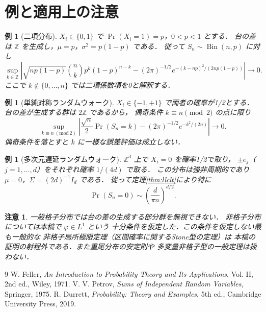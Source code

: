 \documentclass[a5paper,10pt,onecolumn]{jsarticle}
\theoremstyle{mathnotetheorem}
\newtheorem{example}[theorem]{例}
\newtheorem{remark}[theorem]{注意}
\begin{document}
\section{例と適用上の注意}
\begin{example}[二項分布]
$X_i\in\{0,1\}$ で $\Pr(X_i=1)=p$，$0<p<1$ とする．
台の差は $\mathbb Z$ を生成し，$\mu=p$，$\sigma^2=p(1-p)$ である．
従って $S_n\sim\operatorname{Bin}(n,p)$ に対し
\[
 \sup_{k\in\mathbb Z}\left|
 \sqrt{np(1-p)}\binom nk p^k(1-p)^{n-k}
 -(2\pi)^{-1/2}e^{-(k-np)^2/(2np(1-p))}
 \right|\to0.
\]
ここで $k\notin\{0,\ldots,n\}$ では二項係数項を0と解釈する．
\end{example}

\begin{example}[単純対称ランダムウォーク]
$X_i\in\{-1,+1\}$ で両者の確率が1/2とする．
台の差が生成する群は $2\mathbb Z$ であるから，
偶奇条件 $k\equiv n\pmod2$ の点に限り
\[
 \sup_{k\equiv n\ (\mathrm{mod}\,2)}
 \left|\frac{\sqrt n}{2}\Pr(S_n=k)
 -(2\pi)^{-1/2}e^{-k^2/(2n)}\right|\to0.
\]
偶奇条件を落とすと $k$ に一様な誤差評価は成立しない．
\end{example}

\begin{example}[多次元遅延ランダムウォーク]
$\mathbb Z^d$ 上で $X_i=0$ を確率1/2で取り，
$\pm e_j$（$j=1,\ldots,d$）をそれぞれ確率 $1/(4d)$ で取る．
この分布は強非周期的であり
$\mu=0$，$\Sigma=(2d)^{-1}I_d$ である．
従って定理\ref{thm:llclt}により特に
\[
 \Pr(S_n=0)\sim\left(\frac d{\pi n}\right)^{d/2}.
\]
\end{example}

\begin{remark}
一般格子分布では台の差の生成する部分群を無視できない．
非格子分布については本稿で $\varphi\in L^1$ という
十分条件を仮定した．この条件を仮定しない最も一般的な
非格子局所極限定理（区間確率に関するStone型の定理）は
本稿の証明の射程外である．また重尾分布の安定則や
多変量非格子型の一般定理は扱わない．
\end{remark}

\begin{thebibliography}{9}
 W. Feller, \emph{An Introduction to Probability Theory
 and Its Applications}, Vol. II, 2nd ed., Wiley, 1971.
 V. V. Petrov, \emph{Sums of Independent Random Variables},
 Springer, 1975.
 R. Durrett, \emph{Probability: Theory and Examples},
 5th ed., Cambridge University Press, 2019.
\end{thebibliography}
\end{document}
